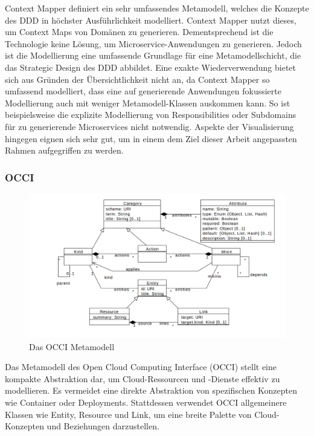 Context Mapper definiert ein sehr umfassendes Metamodell, welches die Konzepte des DDD in höchster Ausführlichkeit modelliert. Context Mapper nutzt dieses, um Context Maps von Domänen zu generieren. Dementsprechend ist die Technologie keine Lösung, um Microservice-Anwendungen zu generieren. Jedoch ist die Modellierung eine umfassende Grundlage für eine Metamodellschicht, die das Strategic Design des DDD abbildet. Eine exakte Wiederverwendung bietet sich aus Gründen der Übersichtlichkeit nicht an, da Context Mapper so umfassend modelliert, dass eine auf generierende Anwendungen fokussierte Modellierung auch mit weniger Metamodell-Klassen auskommen kann. So ist beispielsweise die explizite Modellierung von Responsibilities oder Subdomains für zu generierende Microservices nicht notwendig. Aspekte der Visualisierung hingegen eignen sich sehr gut, um in einem dem Ziel dieser Arbeit angepassten Rahmen aufgegriffen zu werden.

\subsubsection{OCCI}

\begin{figure}[ht]
\centering
\includegraphics[width=\textwidth]{bilder/k3/k3_occi.png}
\caption[Das OCCI Metamodell]{Das OCCI Metamodell \cite[S.5]{edmonds}}
\end{figure}

Das Metamodell des Open Cloud Computing Interface (OCCI) stellt eine kompakte Abstraktion dar, um Cloud-Ressourcen und -Dienste effektiv zu modellieren. Es vermeidet eine direkte Abstraktion von spezifischen Konzepten wie Container oder Deployments. Stattdessen verwendet OCCI allgemeinere Klassen wie Entity, Resource und Link, um eine breite Palette von Cloud-Konzepten und Beziehungen darzustellen.

